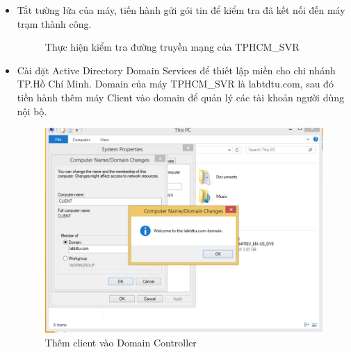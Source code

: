 \begin{itemize}
      \item Tắt tường lửa của máy, tiến hành gửi gói tin để kiểm tra đã kết nối đến máy trạm thành công.
\newpage
        \begin{figure}[htbp]
            \hfill
            \hfill
            \caption{Thực hiện kiểm tra đường truyền mạng của TPHCM\_SVR}
        \end{figure}
        
      \item Cài đặt Active Directory Domain Services để thiết lập miền cho chi nhánh TP.Hồ Chí Minh. Domain của máy TPHCM\_SVR là labtdtu.com, sau đó tiền hành thêm máy Client vào domain để quản lý các tài khoản người dùng nội bộ.

      \begin{figure}[htbp]
        \centering
        \includegraphics[width=0.7\linewidth]{SiteToSiteImg/joinClient.png}
        \caption{Thêm client vào Domain Controller}
        \end{figure}
  \end{itemize}

